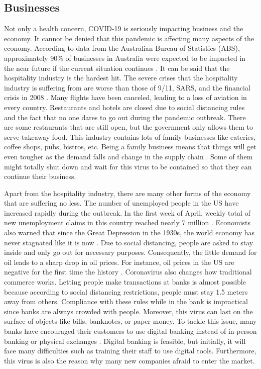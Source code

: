   \subsection{Businesses}
    \par Not only a health concern, COVID-19 is seriously impacting business and the economy. It cannot be denied that this pandemic is affecting many aspects of the economy. According to data from the Australian Bureau of Statistics (ABS), approximately 90\% of businesses in Australia were expected to be impacted in the near future if the current situation continues \parencite{Stake8}. It can be said that the hospitality industry is the hardest hit. The severe crises that the hospitality industry is suffering from are worse than those of 9/11, SARS, and the financial crisis in 2008 \parencite{Stake9}. Many flights have been canceled, leading to a loss of aviation in every country. Restaurants and hotels are closed due to social distancing rules and the fact that no one dares to go out during the pandemic outbreak. There are some restaurants that are still open, but the government only allows them to serve takeaway food. This industry contains lots of family businesses like eateries, coffee shops, pubs, bistros, etc. Being a family business means that things will get even tougher as the demand falls and change in the supply chain \parencite{Stake9}. Some of them might totally shut down and wait for this virus to be contained so that they can continue their business.
    
    \par Apart from the hospitality industry, there are many other forms of the economy that are suffering no less. The number of unemployed people in the US have increased rapidly during the outbreak. In the first week of April, weekly total of new unemployment claims in this country reached nearly 7 million \parencite{Stake10}. Economists also warned that since the Great Depression in the 1930s, the world economy has never stagnated like it is now \parencite{Stake11}. Due to social distancing, people are asked to stay inside and only go out for necessary purposes. Consequently, the little demand for oil leads to a sharp drop in oil prices. For instance, oil prices in the US are negative for the first time the history \parencite{Stake10}. Coronavirus also changes how traditional commerce works. Letting people make transactions at banks is almost possible because according to social distancing restrictions, people must stay 1.5 meters away from others. Compliance with these rules while in the bank is impractical since banks are always crowded with people. Moreover, this virus can last on the surface of objects like bills, banknotes, or paper money. To tackle this issue, many banks have encouraged their customers to use digital banking instead of in-person banking or physical exchanges \parencite{Stake12}. Digital banking is feasible, but initially, it will face many difficulties such as training their staff to use digital tools. Furthermore, this virus is also the reason why many new companies afraid to enter the market.
    
